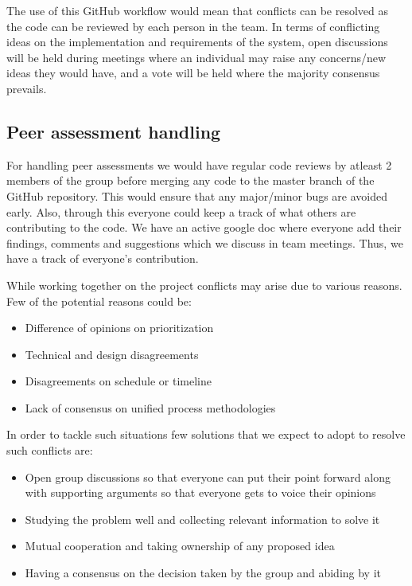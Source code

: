 \documentclass[11pt,a4paper]{article}
\begin{document}
The use of this GitHub workflow would mean that conflicts can be resolved as the code can be reviewed by each person in the team. In terms of conflicting ideas on the implementation and requirements of the system, open discussions will be held during meetings where an individual may raise any concerns/new ideas they would have, and a vote will be held where the majority consensus prevails.

\subsection{Peer assessment handling}

For handling peer assessments we would have regular code reviews by atleast 2 members of the group before merging any code to the master branch of the GitHub repository. This would ensure that any major/minor bugs are avoided early. Also, through this everyone could keep a track of what others are contributing to the code. We have an active google doc where everyone add their findings, comments and suggestions which we discuss in team meetings. Thus, we have a track of everyone's contribution.

While working together on the project conflicts may arise due to various reasons. Few of the potential reasons could be:
\begin{itemize}
\item Difference of opinions on prioritization
\item Technical and design disagreements
\item Disagreements on schedule or timeline
\item Lack of consensus on unified process methodologies
\end{itemize}
In order to tackle such situations few solutions that we expect to adopt to resolve such conflicts are:
\begin{itemize}
\item Open group discussions so that everyone can put their point forward along with supporting arguments so that everyone gets to voice their opinions
\item Studying the problem well and collecting relevant information to solve it
\item Mutual cooperation and taking ownership of any proposed idea
\item Having a consensus on the decision taken by the group and abiding by it
\end{itemize}

\end{document}
